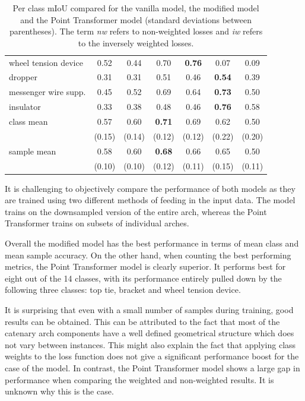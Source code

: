 \begin{table}[ht]
\begin{tabular}{lcccccc}
        wheel tension device & 0.52 & 0.44 & 0.70 & \textbf{0.76} & 0.07 & 0.09\\
        dropper & 0.31 & 0.31  & 0.51 & 0.46 &\textbf{0.54} & 0.39\\
        messenger wire supp. & 0.45 & 0.52  & 0.69 & 0.64 & \textbf{0.73} & 0.50\\
        insulator & 0.33 & 0.38  & 0.48 & 0.46 & \textbf{0.76} & 0.58\\
        \midrule
        class mean & 0.57  & 0.60 & \textbf{0.71} & 0.69 & 0.62  & 0.50 \\
        & (0.15) & (0.14) & (0.12) & (0.12) & (0.22) & (0.20) \\
        sample mean & 0.58 & 0.60 & \textbf{0.68} & 0.66 & 0.65 & 0.50\\
        & (0.10) & (0.10) & (0.12) & (0.11) & (0.15) & (0.11) \\
        \bottomrule
    \end{tabular}
    \caption{Per class mIoU compared for the vanilla \pnpp{} model, the modified \pnpp{} model and the Point Transformer model (standard deviations between parentheses). The term \emph{nw} refers to non-weighted losses and \emph{iw} refers to the inversely weighted losses.}
    \label{tbl:semseg:comp}
\end{table}

It is challenging to objectively compare the performance of both models as they are trained using two different methods of feeding in the input data. The \pnpp{} model trains on the downsampled version of the entire arch, whereas the Point Transformer trains on subsets of individual arches.

Overall the modified \pnpp{} model has the best performance in terms of mean class and mean sample accuracy. On the other hand, when counting the best performing metrics, the Point Transformer model is clearly superior. It performs best for eight out of the 14 classes, with its performance entirely pulled down by the following three classes: top tie, bracket and wheel tension device.

It is surprising that even with a small number of samples during training, good results can be obtained. This can be attributed to the fact that most of the catenary arch components have a well defined geometrical structure which does not vary between instances. This might also explain the fact that applying class weights to the loss function does not give a significant performance boost for the case of the \pnpp{} model. In contrast, the Point Transformer model shows a large gap in performance when comparing the weighted and non-weighted results. It is unknown why this is the case.

